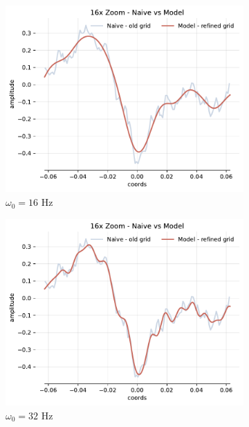\begin{figure}[h]
    \begin{subfigure}[b]{0.32\textwidth}
        \centering
        \includegraphics[width=\textwidth]{img/ch4/16x_zoom-1hl-16hf-16hz.pdf}
        \caption{$\omega_0=16$ Hz}
    \end{subfigure}
    \begin{subfigure}[b]{0.32\textwidth}
        \centering
        \includegraphics[width=\textwidth]{img/ch4/16x_zoom-1hl-16hf-32hz.pdf}
        \caption{$\omega_0=32$ Hz}
    \end{subfigure}
    \begin{subfigure}[b]{0.32\textwidth}

\end{subfigure}
\end{figure}
